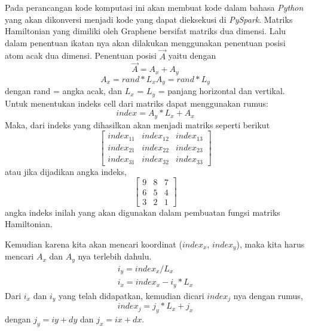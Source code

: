 \documentclass[12pt,a4paper]{report}
\begin{document}
	Pada perancangan kode komputasi ini akan membuat kode dalam bahasa \textit{Python} yang akan dikonversi menjadi kode yang dapat dieksekusi di \textit{PySpark}. Matriks Hamiltonian yang dimiliki oleh Graphene bersifat matriks dua dimensi. Lalu dalam penentuan ikatan nya akan dilakukan menggunakan penentuan posisi atom acak dua dimensi. Penentuan posisi {$\vec{A}$} yaitu dengan
	\begin{equation}
	\vec{A} = A_x + A_y
	\end{equation}
	\begin{equation}
	A_x = rand * L_x
	A_y = rand * L_y
	\end{equation}
	dengan rand = angka acak, dan
	{$L_x$} = {$L_y$} = panjang horizontal dan vertikal.\\
	Untuk menentukan indeks cell dari matriks dapat menggunakan rumus:
	\begin{equation}
	index = A_y * L_x + A_x
	\end{equation}
	Maka, dari indeks yang dihasilkan akan menjadi matriks seperti berikut
	\begin{equation}
	\begin{bmatrix}
	index_{11} & index_{12} & index_{13} \\
	index_{21} & index_{22} & index_{23} \\
	index_{31} & index_{32} & index_{33}
	\end{bmatrix}
	\end{equation}
	atau jika dijadikan angka indeks,
	\begin{equation}
	\begin{bmatrix}
	9 & 8 & 7 \\
	6 & 5 & 4 \\
	3 & 2 & 1
	\end{bmatrix}
	\end{equation}
	angka indeks inilah yang akan digunakan dalam pembuatan fungsi matriks Hamiltonian.
	
	Kemudian karena kita akan mencari koordinat ({$index_x$}, {$index_y$}), maka kita harus mencari {$A_x$} dan {$A_y$} nya terlebih dahulu.
	\begin{equation}
	\begin{split}
	i_y = index_x / L_x \\
	i_x = index_x - i_y * L_x
	\end{split}
	\end{equation}
	Dari {$i_x$} dan {$i_y$} yang telah didapatkan, kemudian dicari {$index_j$} nya dengan rumus,
	\begin{equation}
	index_j = j_y * L_x + j_x
	\end{equation}
	dengan {$j_y = iy + dy$} dan {$j_x = ix + dx$}.
	
\end{document}
